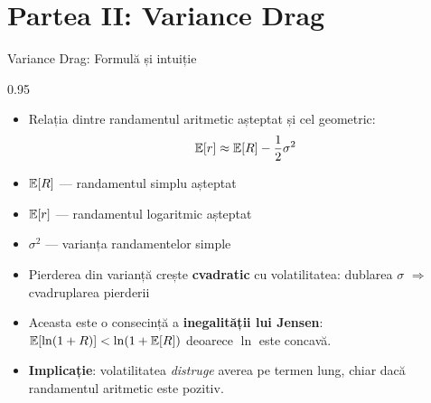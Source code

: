 \documentclass[9pt, aspectratio=169, t]{beamer}
\begin{document}
\section{Partea II: Variance Drag}

\begin{frame}{Variance Drag: Formulă și intuiție}
    \begin{cminipage}{0.95\textwidth}
    \begin{defn}
    \begin{itemize}\setlength{\itemsep}{0pt}
        \item Relația dintre randamentul aritmetic așteptat și cel geometric:
        \[
        \mathbb{E}[r] \approx \mathbb{E}[R] - \frac{1}{2}\sigma^2
        \]
        \item $\mathbb{E}[R]$ --- randamentul simplu așteptat
        \item $\mathbb{E}[r]$ --- randamentul logaritmic așteptat
        \item $\sigma^2$ --- varianța randamentelor simple
    \end{itemize}
    \end{defn}
    \vspace{0.2cm}
    \begin{itemize}\setlength{\itemsep}{0pt}
        \item Pierderea din varianță crește \textbf{cvadratic} cu volatilitatea: dublarea $\sigma$ $\Rightarrow$ cvadruplarea pierderii
        \item Aceasta este o consecință a \textbf{inegalității lui Jensen}: $\mathbb{E}[\ln(1+R)] < \ln(1+\mathbb{E}[R])$ deoarece $\ln$ este concavă.
        \item \textbf{Implicație}: volatilitatea \textit{distruge} averea pe termen lung, chiar dacă randamentul aritmetic este pozitiv.
    \end{itemize}
    \end{cminipage}
\end{frame}
\end{document}
